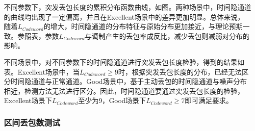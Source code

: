 
不同参数下，突发丢包长度的累积分布函数曲线，如图。两种场景中，时间隐通道的曲线均出现了一定偏离，并且在Excellent场景中的差异更加明显。总体来说，随着$L_{Codeword}$的增大，时间隐通道的分布特征与原始分布更加接近，与理论预期一致。参照表，参数$L_{Codeword}$与调制产生的丢包率成反比，减少丢包则减弱对分布的影响。

不同场景中，对不同参数下的时间隐通道进行突发丢包长度检验，得到的结果如表。Excellent场景中，当$L_{Codeword}\ge 9$时，根据突发丢包长度的分布，已经无法区分时间隐通道与正常通道。Good场景中，基于主动丢包的时间隐通道与噪声分布相近，检测方法无法进行区分。因此，时间隐通道要通过突发丢包长度的检验，Excellent场景下$L_{Codeword}$至少为9，Good场景下$L_{Codeword}\ge 7$即可满足要求。

\subsubsection{区间丢包数测试}
\label{chap:zigzag:results:undetectability:win}

